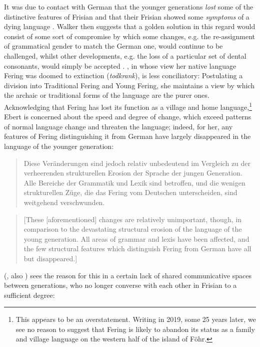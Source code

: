 \documentclass[output=paper]{langsci/langscibook}
\begin{document}
It was due to contact with German that the younger generations \textit{lost} some of the distinctive features of Frisian and that their Frisian showed some \textit{symptoms} of a dying language \citep[210]{Walker1986}. Walker then suggests that a golden solution in this regard would consist of some sort of compromise by which some changes, e.g. the re-assignment of grammatical gender to match the German one, would continue to be challenged, whilst other developments, e.g. the loss of a particular set of dental consonants, would simply be accepted \citep[211]{Walker1986}. \citet{Ebert1994}, in whose view her native language Fering was doomed to extinction (\textit{todkrank}), is less conciliatory: Postulating a division into Traditional Fering and Young Fering, she maintains a view by which the archaic or traditional forms of the language are the purer ones. Acknowledging that Fering has lost its function as a village and home language,\footnote{This appears to be an overstatement. Writing in 2019, some 25 years later, we see no reason to suggest that Fering is likely to abandon its status as a family and village language on the western half of the island of Föhr.} Ebert is concerned about the speed and degree of change, which exceed patterns of normal language change and threaten the language; indeed, for her, any features of Fering distinguishing it from German have largely disappeared in the language of the younger generation:

\begin{quote}
Diese Veränderungen sind jedoch relativ unbedeutend im Vergleich zu der verheerenden strukturellen Erosion der Sprache der jungen Generation. Alle Bereiche der Grammatik und Lexik sind betroffen, und die wenigen strukturellen Züge, die das Fering vom Deutschen unterscheiden, sind weitgehend verschwunden. \citep[11]{Ebert1994}
\end{quote}

\begin{quote}
[These [aforementioned] changes are relatively unimportant, though, in comparison to the devastating structural erosion of the language of the young generation. All areas of grammar and lexis have been affected, and the few structural features which distinguish Fering from German have all but disappeared.]
\end{quote}

\citeauthor{Sjolin1997} (\citeyear{Sjolin1997}, also \citeyear{Sjolin1976}) sees the reason for this in a certain lack of shared communicative spaces between generations, who no longer converse with each other in Frisian to a sufficient degree: 
\end{document}

